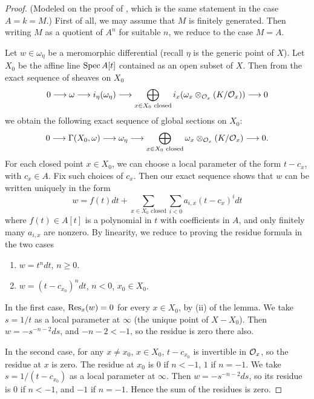 \begin{proof}
(Modeled on the proof of \cite[\nopp Ch.~II,~\S12, Lemma~3]{16}, which is the same statement in the case $A = k = M$.) First of all, we may assume that $M$ is finitely generated. Then writing $M$ as a quotient of $A^{n}$ for suitable $n$, we reduce to the case $M = A$.

Let $w \in \omega_{\eta}$ be a meromorphic differential (recall $\eta$ is the generic point of $X$). Let $X_{0}$ be the affine line $\operatorname{Spec} A[t]$ contained as an open subset of $X$. Then from the exact sequence of sheaves on $X_0$
\[
0 \longrightarrow \omega \longrightarrow i_{\eta}(\omega_{\eta}) \longrightarrow \bigoplus_{x \in X_{0}\text{ closed}} i_{x}(\omega_{x} \otimes_{\mathcal{O}_x} (K/\mathcal{O}_{x})) \longrightarrow 0
\]
we obtain the following exact sequence of global sections on $X_{0}$:
\[
0 \longrightarrow \Gamma(X_{0}, \omega) \longrightarrow \omega_{\eta} \longrightarrow \bigoplus_{x \in X_{0}\text{ closed}} \omega_{x} \otimes_{\mathcal{O}_x} (K/\mathcal{O}_{x}) \longrightarrow 0.
\]
For each closed point $x \in X_{0}$, we can choose a local parameter of the form $t - c_{x}$, with $c_{x} \in A$. Fix such choices of $c_x$. Then our exact sequence shows that $w$ can be written uniquely in the form
\[
w = f(t)dt + \sum_{x \in X_{0}\text{ closed}} \sum_{i < 0} a_{i,x}(t - c_{x})^{i} dt
\]
where $f(t) \in A[t]$ is a polynomial in $t$ with coefficients in $A$, and only finitely many $a_{i,x}$ are nonzero. By linearity, we reduce to proving the residue formula in the two cases
\begin{enumerate}
\item[(1)] $w = t^{n} dt$, $n \ge 0$.
\item[(2)] $w = (t - c_{x_{0}})^{n} dt$, $n < 0$, $x_{0} \in X_{0}$.
\end{enumerate}

In the first case, $\operatorname{Res}_{x}(w) = 0$ for every $x \in X_{0}$, by (ii) of the lemma. We take $s = 1/t$ as a local parameter at $\infty$ (the unique point of $X - X_{0}$). Then $w = -s^{-n-2}ds$, and $-n-2 < -1$, so the residue is zero there also.

In the second case, for any $x \neq x_{0}$, $x \in X_{0}$, $t - c_{x_{0}}$ is invertible in $\mathcal{O}_{x}$, so the residue at $x$ is zero. The residue at $x_{0}$ is $0$ if $n < -1$, $1$ if $n = -1$. We take $s = 1/(t - c_{x_{0}})$ as a local parameter at $\infty$. Then $w = -s^{-n-2}ds$, so its residue is $0$ if $n < -1$, and $-1$ if $n = -1$. Hence the sum of the residues is zero.
\end{proof}

